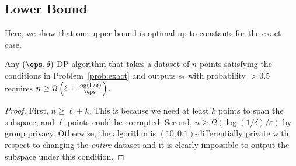 %

\begin{comment}
    
    Key questions: Remove/weaken assumption (ii) general
    position. Approximate case (or discretization).
    
    \subsection{Generalizing beyond general position}
    
    Still assuming $x \subset s_*$ for some $s_* \in \mathcal{S}_d^k$. Also assume $0 \notin x$.
    
    Claim: There exists some $s \in \mathcal{S}_d$ with $u(x,s) \ge n/k$.
    \begin{proof}
    Let $s_k=s_*$. For $i=k,k-1,k-2,\cdots,1$, inductively choose $s_{i-1} \in \mathcal{S}_d$ such that $s_{i-1} \subsetneq s_i$ and $|x \cap s_{i-1}|$ is maximal. By construction, $u(x,s_i) = |x \cap s_i| - |x \cap s_{i-1}|$ for all $i \in [k]$. By assumption, $|x \cap s_k| = n$. Also, $\mathsf{dimension}(s_i) \le i$. Thus $|x \cap s_0| = 0$.
    Since $\sum_{i=1}^k u(x,s_i) = |x \cap s_k| - |x \cap s_0| = n$, we must have $u(x,s_i) \ge n/k$ for some $i \in [k]$.
    \end{proof}

\end{comment}

\subsection{Lower Bound}

Here, we show that our upper bound is optimal up to constants for
the exact case.

\begin{theorem}
     Any $(\eps,\delta)$-DP algorithm that takes a dataset of $n$ points satisfying the conditions
    in Problem~\ref{prob:exact} and outputs $s_*$ with probability $>0.5$ requires
    $n \geq \Omega\left(\ell + \frac{\log(1/\delta)}{\eps}\right).$
\end{theorem}
\begin{proof}
    First, $n \ge \ell + k$. This is because we need at least
    $k$ points to span the subspace, and $\ell$ points could be corrupted.
    Second, $n \ge \Omega(\log(1/\delta)/\varepsilon)$ by group
    privacy. Otherwise, the algorithm is $(10,0.1)$-differentially
    private with respect to changing the \emph{entire} dataset and
    it is clearly impossible to output the subspace under this condition.
\end{proof}
